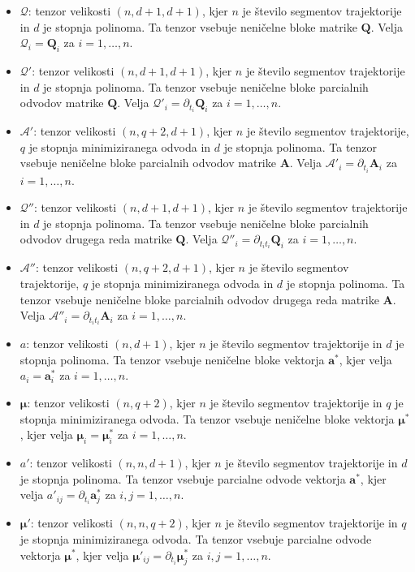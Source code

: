 \documentclass[mat2, tisk]{fmfdelo}
\newcommand{\qmat}{\mathbf{Q}}
\newcommand{\amat}{\mathbf{A}}
\newcommand{\avec}{\mathbf{a}}
\newcommand{\muvec}{\boldsymbol{\mu}}
\begin{document}
\begin{itemize}
    \item $\mathcal{Q}$: tenzor velikosti $(n, d+1, d+1)$, kjer $n$ je število segmentov trajektorije in $d$ je stopnja polinoma. Ta tenzor vsebuje neničelne bloke matrike $\qmat$. Velja $\mathcal{Q}_i = \qmat_i$ za $i=1,\ldots,n$.
    \item $\mathcal{Q'}$: tenzor velikosti $(n, d+1, d+1)$, kjer $n$ je število segmentov trajektorije in $d$ je stopnja polinoma. Ta tenzor vsebuje neničelne bloke parcialnih odvodov matrike $\qmat$. Velja $\mathcal{Q'}_i = \partial_{t_i} \qmat_i$ za $i=1,\ldots,n$.
    \item $\mathcal{A'}$: tenzor velikosti $(n, q+2, d+1)$, kjer $n$ je število segmentov trajektorije, $q$ je stopnja minimiziranega odvoda in $d$ je stopnja polinoma. Ta tenzor vsebuje neničelne bloke parcialnih odvodov matrike $\amat$. Velja $\mathcal{A'}_i = \partial_{t_i} \amat_i$ za $i=1,\ldots,n$.\footnotemark[1]
    \item $\mathcal{Q''}$: tenzor velikosti $(n, d+1, d+1)$, kjer $n$ je število segmentov trajektorije in $d$ je stopnja polinoma. Ta tenzor vsebuje neničelne bloke parcialnih odvodov drugega reda matrike $\qmat$. Velja $\mathcal{Q''}_i = \partial_{t_it_i} \qmat_i$ za $i=1,\ldots,n$.
    \item $\mathcal{A''}$: tenzor velikosti $(n, q+2, d+1)$, kjer $n$ je število segmentov trajektorije, $q$ je stopnja minimiziranega odvoda in $d$ je stopnja polinoma. Ta tenzor vsebuje neničelne bloke parcialnih odvodov drugega reda matrike $\amat$. Velja $\mathcal{A''}_i = \partial_{t_it_i} \amat_i$ za $i=1,\ldots,n$.\footnotemark[1]
    \item $\mathit{a}$: tenzor velikosti $(n, d+1)$, kjer $n$ je število segmentov trajektorije in $d$ je stopnja polinoma. Ta tenzor vsebuje neničelne bloke vektorja $\avec^*$, kjer velja $\mathit{a}_i = \avec^*_i$ za $i=1,\ldots,n$.
    \item $\boldsymbol{\mu}$: tenzor velikosti $(n, q+2)$, kjer $n$ je število segmentov trajektorije in $q$ je stopnja minimiziranega odvoda. Ta tenzor vsebuje neničelne bloke vektorja $\muvec^*$, kjer velja $\boldsymbol{\mu}_i = \muvec^*_i$ za $i=1,\ldots,n$.
    \item $\mathit{a}'$: tenzor velikosti $(n, n, d+1)$, kjer $n$ je število segmentov trajektorije in $d$ je stopnja polinoma. Ta tenzor vsebuje parcialne odvode vektorja $\avec^*$, kjer velja $\mathit{a}'_{ij} = \partial_{t_i} \avec^*_j$ za $i,j=1,\ldots,n$.
    \item $\boldsymbol{\mu}'$: tenzor velikosti $(n, n, q+2)$, kjer $n$ je število segmentov trajektorije in $q$ je stopnja minimiziranega odvoda. Ta tenzor vsebuje parcialne odvode vektorja $\muvec^*$, kjer velja $\boldsymbol{\mu}'_{ij} = \partial_{t_i} \muvec^*_j$ za $i,j=1,\ldots,n$.
\end{itemize}
\end{document}
